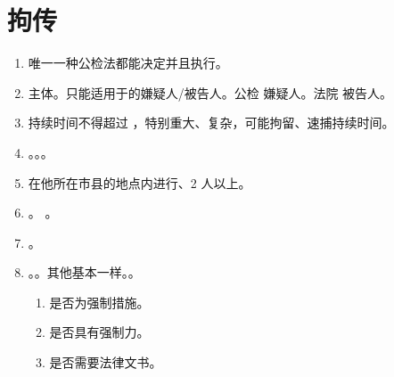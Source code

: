 \section{拘传}
\begin{enumerate}
  \item 唯一一种公检法都能决定并且执行。
  \item 主体。只能适用于的嫌疑人/被告人。公检 \yjt 嫌疑人。法院 \yjt 被告人。
  \item 持续时间不得超过 ，特别重大、复杂，可能拘留、速捕持续时间。
  \item {}。。。
  \item 在他所在市县的地点内进行、2 人以上。
  \item {}。
        。
  \item {}。
  \item {}。。其他基本一样。。
        \begin{enumerate}
          \item 是否为强制措施。
          \item 是否具有强制力。
          \item 是否需要法律文书。
        \end{enumerate}
\end{enumerate}
